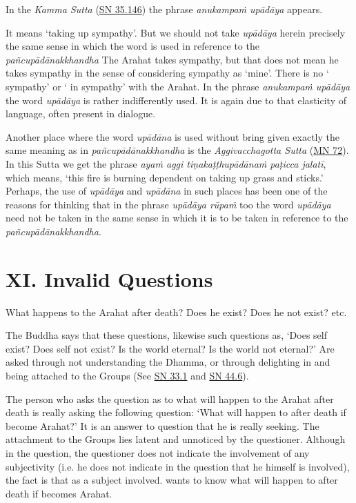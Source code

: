 In the \emph{Kamma Sutta} (\href{https://suttacentral.net/sn35.146/en/bodhi}{SN 35.146}) the phrase \emph{anukampaṁ upādāya} appears.

It means `taking up sympathy'. But we should not take \emph{upādāya} herein precisely the same sense in which the word is used in reference to the \emph{pañcupādānakkhandha} The Arahat takes sympathy, but that does not mean he takes sympathy in the sense of considering sympathy as `mine'. There is no ` sympathy' or ` in sympathy' with the Arahat. In the phrase \emph{anukampaṁ upādāya} the word \emph{upādāya} is rather indifferently used. It is again due to that elasticity of language, often present in dialogue.

Another place where the word \emph{upādāna} is used without bring given exactly the same meaning as in \emph{pañcupādānakkhandha} is the \emph{Aggivacchagotta Sutta} (\href{https://suttacentral.net/mn72/en/thanissaro}{MN 72}). In this Sutta we get the phrase \emph{ayaṁ aggi tiṇakaṭṭhupādānaṁ paṭicca jalatī}, which means, `this fire is burning dependent on taking up grass and sticks.' Perhaps, the use of \emph{upādāya} and \emph{upādāna} in such places has been one of the reasons for thinking that in the phrase \emph{upādāya rūpaṁ} too the word \emph{upādāya} need not be taken in the same sense in which it is to be taken in reference to the \emph{pañcupādānakkhandha}.

\section{XI. Invalid Questions}

What happens to the Arahat after death? Does he exist? Does he not exist? etc.

The Buddha says that these questions, likewise such questions as, `Does self exist? Does self not exist? Is the world eternal? Is the world not eternal?' Are asked through not understanding the Dhamma, or through delighting in and being attached to the Groups (See \href{https://suttacentral.net/sn33.1/en/sujato}{SN 33.1} and \href{https://suttacentral.net/sn44.6/en/bodhi}{SN 44.6}).

The person who asks the question as to what will happen to the Arahat after death is really asking the following question: `What will happen to  after death if  become Arahat?' It is an answer to  question that he is really seeking. The attachment to the Groups lies latent and unnoticed by the questioner. Although in the question, the questioner does not indicate the involvement of any subjectivity (i.e. he does not indicate in the question that he himself is involved), the fact is that  as a subject  involved.  wants to know what will happen to  after death if  becomes Arahat.

